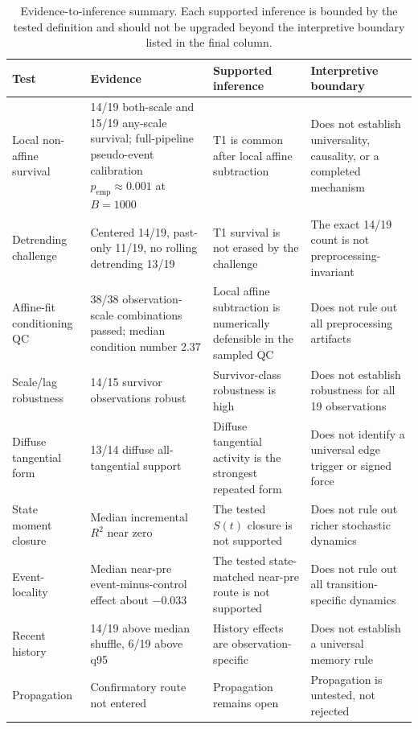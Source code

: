 \begin{table}[t]
\caption{Evidence-to-inference summary. Each supported inference is bounded by
the tested definition and should not be upgraded beyond the interpretive
boundary listed in the final column.}
\label{tab:evidence_claims}
\centering
\begingroup
\footnotesize
\setlength{\tabcolsep}{4pt}
\renewcommand{\arraystretch}{1.15}
\begin{tabular}{@{}p{}p{}p{}p{}@{}}
\toprule
Test & Evidence & Supported inference & Interpretive boundary \\
\midrule
Local non-affine survival & 14/19 both-scale and 15/19 any-scale survival; full-pipeline pseudo-event calibration $p_{\mathrm{emp}}\approx0.001$ at $B=1000$ & T1 is common after local affine subtraction & Does not establish universality, causality, or a completed mechanism \\
Detrending challenge & Centered 14/19, past-only 11/19, no rolling detrending 13/19 & T1 survival is not erased by the challenge & The exact 14/19 count is not preprocessing-invariant \\
Affine-fit conditioning QC & 38/38 observation-scale combinations passed; median condition number 2.37 & Local affine subtraction is numerically defensible in the sampled QC & Does not rule out all preprocessing artifacts \\
Scale/lag robustness & 14/15 survivor observations robust & Survivor-class robustness is high & Does not establish robustness for all 19 observations \\
Diffuse tangential form & 13/14 diffuse all-tangential support & Diffuse tangential activity is the strongest repeated form & Does not identify a universal edge trigger or signed force \\
State moment closure & Median incremental $R^2$ near zero & The tested $S(t)$ closure is not supported & Does not rule out richer stochastic dynamics \\
Event-locality & Median near-pre event-minus-control effect about $-0.033$ & The tested state-matched near-pre route is not supported & Does not rule out all transition-specific dynamics \\
Recent history & 14/19 above median shuffle, 6/19 above q95 & History effects are observation-specific & Does not establish a universal memory rule \\
Propagation & Confirmatory route not entered & Propagation remains open & Propagation is untested, not rejected \\
\bottomrule
\end{tabular}
\endgroup
\end{table}
